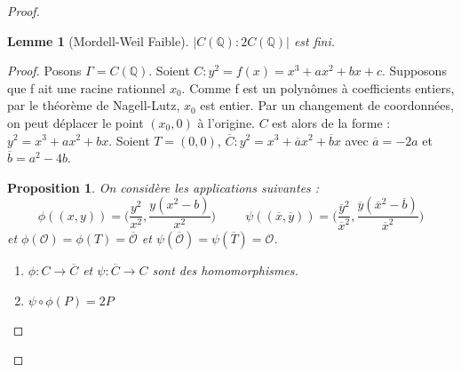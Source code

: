 \documentclass[a4paper]{article}
\newtheorem{prop}{Proposition}
\newtheorem{lem}{Lemme}
\begin{document}
\begin{proof}
\begin{lem}[Mordell-Weil Faible]
$|C(\mathbb{Q}):2C(\mathbb{Q})|$ est fini.
\end{lem}
\begin{proof}
Posons $\Gamma=C(\mathbb{Q})$.
Soient $C : y^2=f(x)=x^3+ax^2+bx+c$. Supposons que f ait une racine rationnel $x_{0}$. Comme f est un polynômes à coefficients entiers, par le théorème de Nagell-Lutz, $x_{0}$ est entier. Par un changement de coordonnées, on peut déplacer le point $(x_{0},0)$ à l'origine.
$C$ est alors de la forme : $y^2=x^3+ax^2+bx$.
Soient $T=(0,0)$, $\overline{C}: y^2=x^3+\overline{a}x^2+\overline{b}x$ avec $\overline{a}=-2a$ et $\overline{b}=a^2-4b$. 

\begin{prop} 
On considère les applications suivantes : 
\begin{equation*}
\phi((x,y))=\Big(\frac{y^2}{x^2},\frac{y(x^2-b)}{x^2}\Big) \hspace{1cm} \psi((\overline{x},\overline{y}))=\Big(\frac{\overline{y}^2}{\overline{x}^2},\frac{\overline{y}(\overline{x}^2-\overline{b})}{\overline{x}^2}\Big)
\end{equation*}
et $\phi(\mathcal{O})=\phi(T)=\mathcal{\overline{O}}$ et 
$\psi(\overline{\mathcal{O}})=\psi(\overline{T})=\mathcal{O}$.
\begin{enumerate} 
\item $\phi : C \rightarrow \overline{C}$ et $\psi : \overline{C} \rightarrow C$ sont des homomorphismes. 
\item $\psi \circ \phi (P)=2P$
\end{enumerate}
\end{prop}


\end{proof}
\end{proof}
\end{document}
